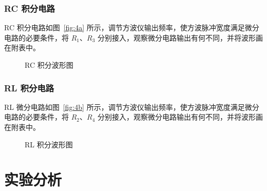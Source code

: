 \documentclass[a4paper,utf8]{article}
\begin{document}
    \subsubsection{RC 积分电路}
        RC 积分电路如图~\ref{fig:4a} 所示，调节方波仪输出频率，使方波脉冲宽度满足微分电路的必要条件，将 $R_1$、$R_3$ 分别接入，观察微分电路输出有何不同，并将波形画在附表中。
        \begin{figure}[!ht]
            \hspace{6mm}
            \caption{RC 积分波形图}
        \end{figure}
    \subsubsection{RL 积分电路}
        RL 微分电路如图~\ref{fig:4b} 所示，调节方波仪输出频率，使方波脉冲宽度满足微分电路的必要条件，将 $R_2$、$R_4$ 分别接入，观察微分电路输出有何不同，并将波形画在附表中。
        \begin{figure}[!ht]
            \hspace{6mm}
            \caption{RL 积分波形图}
        \end{figure}

\section{实验分析}
\end{document}
